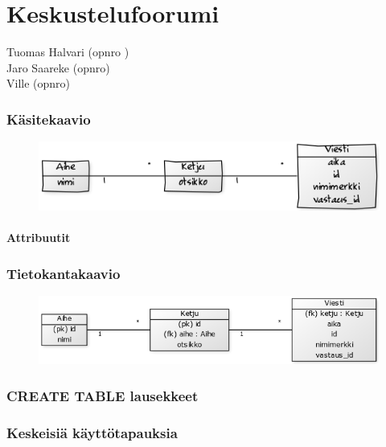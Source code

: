 \documentclass[12pt,a4paper]{article}
\begin{document}
\part*{Keskustelufoorumi}
Tuomas Halvari (opnro ) \\
Jaro Saareke (opnro) \\
Ville  (opnro)
\newpage
\section{Käsitekaavio}
\begin{figure}[h]
\includegraphics[width=\textwidth]{6bd37a82}
\end{figure}
\subsection{Attribuutit}
\section{Tietokantakaavio}
\begin{figure}[h]
\includegraphics[width=\textwidth]{2ca63d43}
\end{figure}
\section{CREATE TABLE lausekkeet}
\section{Keskeisiä käyttötapauksia}
\end{document}
